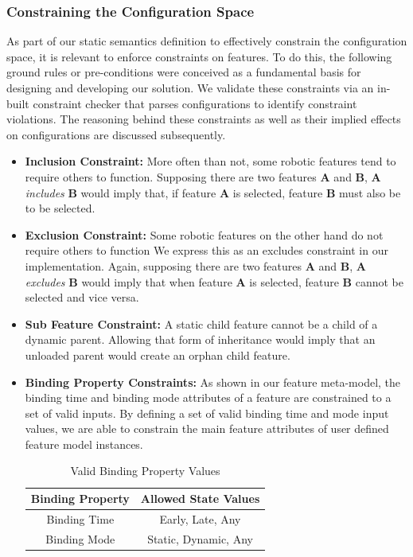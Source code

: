 \documentclass[conference]{IEEEtran}
\begin{document}
\subsubsection{Constraining the Configuration Space}
As part of our static semantics definition to effectively constrain the configuration space, it is relevant to enforce constraints on features. To do this, the following ground rules or pre-conditions were conceived as a fundamental basis for designing and developing our solution. We validate these constraints via an in-built constraint checker that parses configurations to identify constraint violations. The reasoning behind these constraints as well as their implied effects on configurations are discussed subsequently.
\begin{itemize}
    \item \textbf{Inclusion Constraint: }
    More often than not, some robotic features tend to require others to function. Supposing there are two features \textbf{A} and \textbf{B}, \textbf{A} \textit{includes} \textbf{B} would imply that, if feature \textbf{A} is selected, feature \textbf{B} must also be to be selected.
    
    \item \textbf{Exclusion Constraint: }
    Some robotic features on the other hand do not require others to function We express this as an excludes constraint in our implementation. Again, supposing there are two features \textbf{A} and \textbf{B}, \textbf{A} \textit{excludes} \textbf{B} would imply that when feature \textbf{A} is selected, feature \textbf{B} cannot be selected and vice versa.
    
    
    \item \textbf{Sub Feature Constraint: }
    A static child feature cannot be a child of a dynamic parent. Allowing that form of inheritance would imply that an unloaded parent would create an orphan child feature. 
    

\item \textbf{Binding Property Constraints: }
As shown in our feature meta-model, the binding time and binding mode attributes of a feature are constrained to a set of valid inputs. By defining a set of valid binding time and mode input values, we are able to constrain the main feature attributes of user defined feature model instances.

\begin{table}[htbp]
\caption{Valid Binding Property Values}
\begin{center}
\begin{tabular}{|c|c|}
\hline
    Binding Property & Allowed State Values  \\ \hline
    Binding Time & Early, Late, Any \\ \hline
    Binding Mode & Static, Dynamic, Any\\ \hline
\end{tabular}
\label{tab:bpropcon}
\end{center}
\end{table}


\end{itemize}
\end{document}
